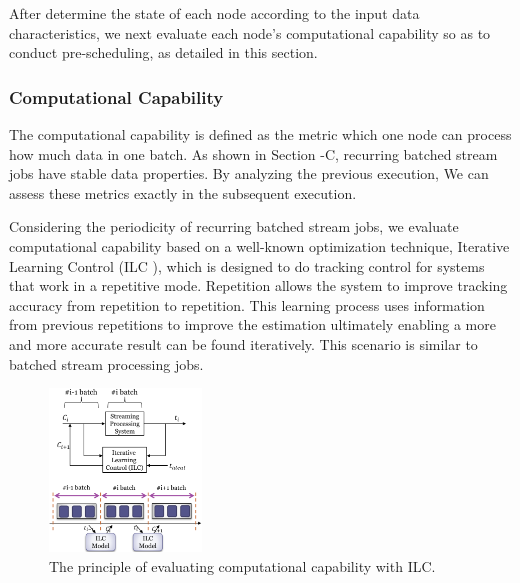 \documentclass[10pt,conference,compsocconf,letterpaper]{IEEEtran}
\begin{document}
  After determine the state of each node according to the input data characteristics, we next evaluate each node's computational capability so as to conduct pre-scheduling, as detailed in this section.

\subsubsection{Computational Capability}

  The computational capability is defined as the metric which one node can process how much data in one batch. As shown in Section \uppercase\expandafter{}-C, recurring batched stream jobs have stable data properties. By analyzing the previous execution, We can assess these metrics exactly in the subsequent execution.

  Considering the periodicity of recurring batched stream jobs, we evaluate computational capability based on a well-known optimization technique, Iterative Learning Control (ILC \cite{Arimoto}), which is designed to do tracking control for systems that work in a repetitive mode. Repetition allows the system to improve tracking accuracy from repetition to repetition. This learning process uses information from previous repetitions to improve the estimation ultimately enabling a more and more accurate result can be found iteratively. This scenario is similar to batched stream processing jobs.
  \begin{figure}[htbp]
    \centering
    \includegraphics[width=0.36\textwidth]{FigureILC}
    \caption{The principle of evaluating computational capability with ILC.}
    \label{Fig. 7:}
  \end{figure}
\end{document}
